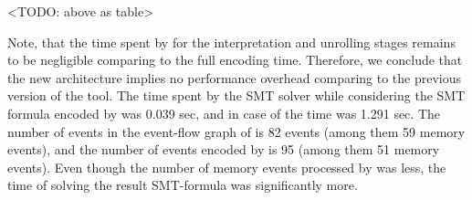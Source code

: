 
<TODO: above as table>

Note, that the time spent by \porthos[2] for the interpretation and unrolling stages remains to be negligible comparing to the full encoding time.
Therefore, we conclude that the new architecture implies no performance overhead comparing to the previous version of the tool.
The time spent by the SMT solver while considering the SMT formula encoded by \porthos[2] was 0.039 sec, and in case of \porthos[1] the time was 1.291 sec.
The number of events in the event-flow graph of \porthos[2] is 82 events (among them 59 memory events), and the number of events encoded by \porthos[1] is 95 (among them 51 memory events).
Even though the number of memory events processed by \porthos[1] was less, the time of solving the result SMT-formula was significantly more.

%


